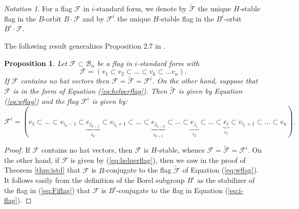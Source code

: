 \documentclass[12pt]{amsart}
\numberwithin{equation}{section}
\newtheorem{prop}[thm]{Proposition}
\theoremstyle{remark}
\newtheorem{nota}[thm]{Notation}
\theoremstyle{definition}
\newcommand{\B}{\mathcal{B}}
\newcommand{\he}{\hat{e}}
\newcommand{\F}{\mathcal{F}}
\begin{document}
\begin{nota} \label{note:iandtildeflags}
For a flag $\F$ in $i$-standard form, we denote by $\tilde{\F}$ the unique $H$-stable flag in the $B$-orbit $B\cdot \F$ and by $\F^{i}$ the unique $H$-stable flag in the $B^{i}$-orbit $B^{i}\cdot \F$.  
\end{nota}
\noindent The following result generalizes Proposition 2.7 in \cite{Shpairs}.
\begin{prop}\label{p:iandtildeflags}
Let $\F\subset\B_{n}$ be a flag in $i$-standard form with 
$$
\F=(v_{1}\subset v_{2}\subset \dots \subset v_{k}\subset \dots v_{n}).
$$
If $\F$ contains no hat vectors then $\F=\tilde{\F}=\F^{i}$.  On the other hand, suppose that $\F$ is in the form of Equation (\ref{eq:helperflag}).
Then $\tilde{\F}$ is given by Equation (\ref{eq:wflag})
and the flag $\F^{i}$ is given by:
\begin{equation}\label{eq:i-flag}
\F^{i}=(v_{1}\subset\dots\subset v_{i_{k}-1}\subset\underbrace{ e_{j_{k-1}}}_{i_{k}}\subset v_{i_{k}+1}\subset \dots \subset \underbrace{e_{j_{k-2}}}_{i_{k-1}}\subset \dots \subset \underbrace{e_{j_{1}}}_{i_{2}}\subset \dots\subset \underbrace{e_{i}}_{i_{1}}\subset v_{i_{1}+1}\subset \dots\subset v_{n}).
\end{equation}
\end{prop}
\begin{proof}
If $\F$ contains no hat vectors, then $\F$ is $H$-stable, whence $\F=\tilde{\F}=\F^{i}$.  
On the other hand, if $\F$ is given by (\ref{eq:helperflag}), then we saw in the proof of Theorem \ref{thm:istd} that $\F$ is $B$-conjugate to the flag $\tilde{\F}$ of Equation (\ref{eq:wflag}).  It follows easily from the definition of the Borel subgroup $B^{i}$ as the stabilizer of the flag in (\ref{eq:Fiflag}) that $\F$ is $B^{i}$-conjugate to the flag in Equation (\ref{eq:i-flag}).
\end{proof}
\end{document}
